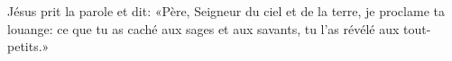 \encetemps Jésus prit la parole et dit:
	«Père, Seigneur du ciel et de la terre, je proclame ta louange:
	ce que tu as caché aux sages et aux savants,
	tu l’as révélé aux tout-petits.»

